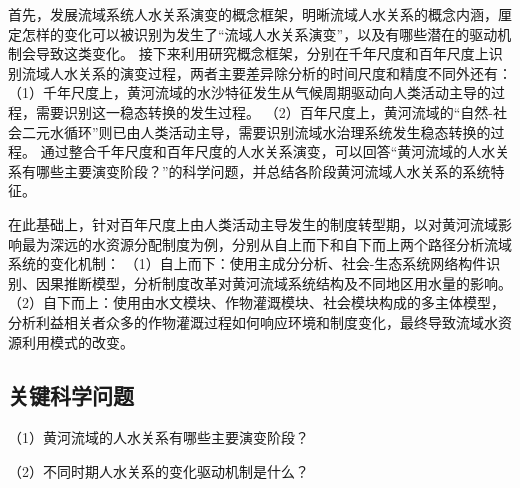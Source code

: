 首先，发展流域系统人水关系演变的概念框架，明晰流域人水关系的概念内涵，厘定怎样的变化可以被识别为发生了“流域人水关系演变”，以及有哪些潜在的驱动机制会导致这类变化。
接下来利用研究概念框架，分别在千年尺度和百年尺度上识别流域人水关系的演变过程，两者主要差异除分析的时间尺度和精度不同外还有：
（1）千年尺度上，黄河流域的水沙特征发生从气候周期驱动向人类活动主导的过程，需要识别这一稳态转换的发生过程。
（2）百年尺度上，黄河流域的“自然-社会二元水循环”则已由人类活动主导，需要识别流域水治理系统发生稳态转换的过程。
通过整合千年尺度和百年尺度的人水关系演变，可以回答“黄河流域的人水关系有哪些主要演变阶段？”的科学问题，并总结各阶段黄河流域人水关系的系统特征。

在此基础上，针对百年尺度上由人类活动主导发生的制度转型期，以对黄河流域影响最为深远的水资源分配制度为例，分别从自上而下和自下而上两个路径分析流域系统的变化机制：
（1）自上而下：使用主成分分析、社会-生态系统网络构件识别、因果推断模型，分析制度改革对黄河流域系统结构及不同地区用水量的影响。
（2）自下而上：使用由水文模块、作物灌溉模块、社会模块构成的多主体模型，分析利益相关者众多的作物灌溉过程如何响应环境和制度变化，最终导致流域水资源利用模式的改变。

\subsection{关键科学问题}

（1）黄河流域的人水关系有哪些主要演变阶段？

（2）不同时期人水关系的变化驱动机制是什么？
